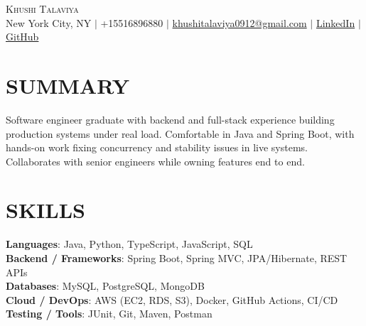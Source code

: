 \documentclass[letterpaper,11pt]{article}
\begin{document}
\begin{center}
    {\Huge \scshape Khushi Talaviya} \\ \vspace{2pt}
    \vspace{4pt}
    \small
    New York City, NY $|$
    \small
    +15516896880 $|$
    \href{mailto:khushitalaviya0912@gmail.com}{khushitalaviya0912@gmail.com} $|$
    \href{https://www.linkedin.com/in/khushitalaviya/}{LinkedIn} $|$
    \href{https://github.com/talaviyakhushi}{GitHub}
\end{center}

\section{SUMMARY}
\vspace{5pt}
\small{Software engineer graduate with backend and full-stack experience building production systems under real load. Comfortable in Java and Spring Boot, with hands-on work fixing concurrency and stability issues in live systems. Collaborates with senior engineers while owning features end to end.}

\vspace{2pt}
\section{SKILLS}
\vspace{5pt}
\begin{itemize}[leftmargin=0in, label={}]
\small{\item{
\textbf{Languages}{: Java, Python, TypeScript, JavaScript, SQL} \\
\textbf{Backend / Frameworks}{: Spring Boot, Spring MVC, JPA/Hibernate, REST APIs} \\
\textbf{Databases}{: MySQL, PostgreSQL, MongoDB} \\
\textbf{Cloud / DevOps}{: AWS (EC2, RDS, S3), Docker, GitHub Actions, CI/CD} \\
\textbf{Testing / Tools}{: JUnit, Git, Maven, Postman}
}}
\end{itemize}
\vspace{-10pt}

\end{document}
